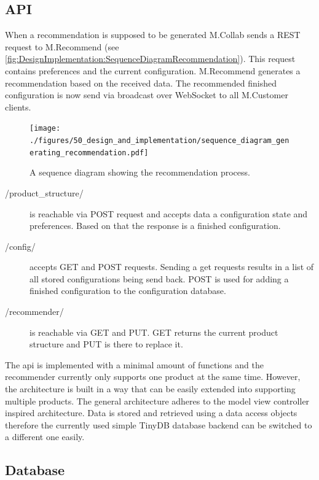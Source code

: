 \subsection{API}




When a recommendation is supposed to be generated M.Collab sends a REST request to M.Recommend (see \autoref{fig:DesignImplementation:SequenceDiagramRecommendation}). This request contains preferences and the current configuration. M.Recommend generates a recommendation based on the received data. The recommended finished configuration is now send via broadcast over WebSocket to all M.Customer clients. 


\begin{figure}
    \centering
    \texttt{[image: ./figures/50\_design\_and\_implementation/sequence\_diagram\_generating\_recommendation.pdf]}
    \caption{A sequence diagram showing the recommendation process.}
    \label{fig:DesignImplementation:SequenceDiagramRecommendation}
\end{figure}

\begin{description}
    \item[/product\_structure/] is reachable via POST request and accepts data a configuration state and preferences. Based on that the response is a finished configuration.
    \item[/config/] accepts GET and POST requests. Sending a get requests results in a list of all stored configurations being send back. POST is used for adding a finished configuration to the configuration database.
    \item[/recommender/] is reachable via GET and PUT. GET returns the current product structure and PUT is there to replace it.
\end{description}

The api is implemented with a minimal amount of functions and the recommender currently only supports one product at the same time. However, the architecture is built in a way that can be easily extended into supporting multiple products.
The general architecture adheres to the model view controller inspired architecture.
Data is stored and retrieved using a data access objects therefore the currently used simple TinyDB database backend can be switched to a different one easily.

\subsection{Database}


